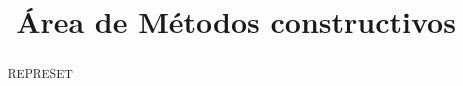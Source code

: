 \documentclass[]{article}
\title{\vspace{-5cm}\centering \bfseries Área de Métodos constructivos }
\author{}
\date{}
\begin{document}
\maketitle


\begin{abstract}
	\vspace{-1cm}REPRESET

\end{abstract}

\section{}
\end{document}
